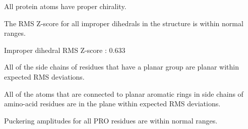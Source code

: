 \begin{note}
All protein atoms have proper chirality.
\end{note}

\begin{note}
The RMS Z-score for all improper dihedrals in the structure is within
normal ranges.

\parbox{1\textwidth}{
 Improper dihedral RMS Z-score : 0.633
}%

\end{note}

\begin{note}
All of the side chains of residues that have a planar group are
planar within expected RMS deviations.
\end{note}

\begin{note}
All of the atoms that are connected to planar aromatic rings in side
chains of amino-acid residues are in the plane within expected RMS
deviations.
\end{note}

\begin{note}
Puckering amplitudes for all PRO residues are within normal ranges.
\end{note}

